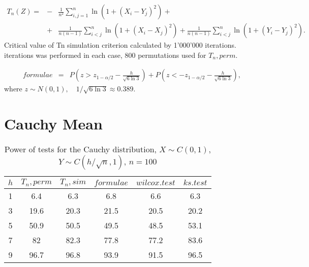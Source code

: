 \documentclass{svproc}
\begin{document}
\begin{eqnarray*}
  T_n(Z) = &-&\frac{1}{n^2}\sum_{i,j=1}^n\ln(1+(X_i-Y_j)^2)+ \\
           &+&\frac{1}{n(n-1)}\sum_{i<j}^n\ln(1+(X_i-X_j)^2)+\frac{1}{n(n-1)}\sum_{i<j}^n\ln(1+(Y_i-Y_j)^2).
\end{eqnarray*}
Critical value of Tn simulation criterion calculated by 1'000'000 iterations.
 iterations was performed in each case, 800 permutations used for $T_n, perm$.

\begin{eqnarray*}
  formulae &=& P(z > z_{1-\alpha/2} - \frac{h}{\sqrt{6\ln 3}}) + P(z < -z_{1-\alpha/2} - \frac{h}{\sqrt{6\ln 3}}),
\end{eqnarray*}
where $z\sim N(0,1),\quad 1/\sqrt{6\ln 3}\approx 0.389$.

\newpage

\section*{Cauchy Mean}

\begin{table}
  \caption{Power of tests for the Cauchy distribution, $X\sim C(0,1)$, $Y\sim C(h/\sqrt{n},1)$, $n=100$}
  \begin{center}
  \begin{tabular}{c@{\quad}c@{\quad}c@{\quad}c@{\quad}c@{\quad}c}
  \hline
  $h$ & $T_n, perm$ & $T_n, sim$ & $formulae$ & $wilcox.test$ & $ks.test$ \\
  \hline
  1 & 6.4 & 6.3 & 6.8 & 6.6 & 6.3 \\
  3 & 19.6 & 20.3 & 21.5 & 20.5 & 20.2 \\
  5 & 50.9 & 50.5 & 49.5 & 48.5 & 53.1 \\
  7 & 82 & 82.3 & 77.8 & 77.2 & 83.6 \\
  9 & 96.7 & 96.8 & 93.9 & 91.5 & 96.5 \\
  \hline
  \end{tabular}
  \end{center}
\end{table}
\end{document}
